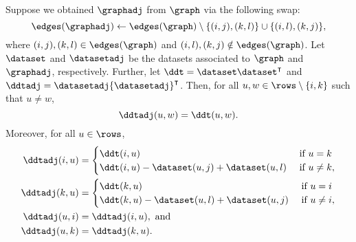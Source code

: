 \begin{corollary}\label{cor:ddtadj}
	Suppose we obtained $\graphadj$ from $\graph$ via the following swap:
	\[
		\edges(\graphadj) \leftarrow \edges(\graph) \setminus \{(i, j), (k, l)\}
		\cup \{(i, l), (k, j)\},
	\]
	where $(i, j), (k, l) \in \edges(\graph)$ and $(i, l), (k, j) \notin
	\edges(\graph)$. Let $\dataset$ and $\datasetadj$ be the datasets associated
	to $\graph$ and $\graphadj$, respectively. Further, let $\ddt = \dataset
	\dataset^\intercal$ and $\ddtadj = \datasetadj {\datasetadj}^\intercal$.
	Then, for all $u, w \in \rows \setminus \{i, k\}$ such that $u \neq w$,
	\[
		\ddtadj(u, w) = \ddt(u, w).
	\]
	Moreover, for all $u \in \rows$,
	\begin{align*}
		\ddtadj(i, u) &=
		\begin{cases}
			\ddt(i, u) & \text{ if } u = k \\
			\ddt(i, u) - \dataset(u, j) + \dataset(u, l) & \text{ if } u \neq k,
		\end{cases} \\
		\ddtadj(k, u) &=
		\begin{cases}
			\ddt(k, u) & \text{ if } u = i \\
			\ddt(k, u) - \dataset(u, l) + \dataset(u, j) & \text{ if } u \neq i,
		\end{cases} \\
		\ddtadj(u, i) &= \ddtadj(i, u), \text{ and } \\
		\ddtadj(u, k) &= \ddtadj(k, u).
	\end{align*}
\end{corollary}


